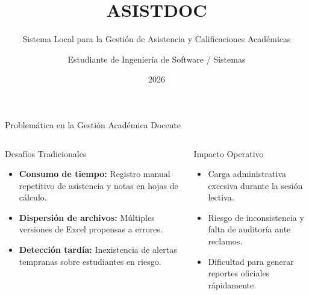 \documentclass[aspectratio=169,10pt]{beamer}
\title[ASISTDOC]{ASISTDOC}
\subtitle{Sistema Local para la Gestión de Asistencia y Calificaciones Académicas}
\author[Proyecto Universitario]{Estudiante de Ingeniería de Software / Sistemas}
\institute[Sistemas]{Proyecto de Ingeniería de Software e Integración de Sistemas}
\date{2026}
\begin{document}
\begin{frame}
  \titlepage
\end{frame}

\begin{frame}{Problemática en la Gestión Académica Docente}
  \begin{columns}
      \begin{block}{Desafíos Tradicionales}
        \begin{itemize}
          \item \textbf{Consumo de tiempo:} Registro manual repetitivo de asistencia y notas en hojas de cálculo.
          \item \textbf{Dispersión de archivos:} Múltiples versiones de Excel propensas a errores.
          \item \textbf{Detección tardía:} Inexistencia de alertas tempranas sobre estudiantes en riesgo.
        \end{itemize}
      \end{block}
      \begin{block}{Impacto Operativo}
        \begin{itemize}
          \item Carga administrativa excesiva durante la sesión lectiva.
          \item Riesgo de inconsistencia y falta de auditoría ante reclamos.
          \item Dificultad para generar reportes oficiales rápidamente.
        \end{itemize}
      \end{block}
  \end{columns}
\end{frame}
\end{document}
